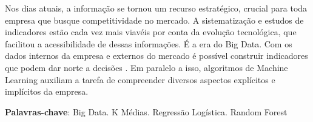 \begin{resumo}
 
 Nos dias atuais, a informação se tornou um recurso estratégico, crucial para toda empresa que busque competitividade no mercado. A sistematização e estudos de indicadores estão cada vez mais viavéis por conta da evolução tecnológica, que facilitou a acessibilidade de dessas informações. É a era do Big Data. Com os dados internos da empresa e externos do mercado é possível construir indicadores que podem dar norte a decisões . Em paralelo a isso, algoritmos de Machine Learning auxiliam a tarefa de compreender diversos aspectos explícitos e implícitos da empresa.

 \textbf{Palavras-chave}: Big Data. K Médias. Regressão Logística. Random Forest 
\end{resumo}